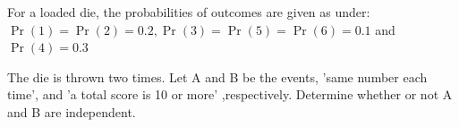 \documentclass[]{article}
\begin{document}
\providecommand{\qfunc}[1]{\ensuremath{Q\left(#1\right)}}
\providecommand{\gauss}[2]{\mathcal{N}\ensuremath{\left(#1,#2\right)}}
\providecommand{\diff}[2]{\ensuremath{\frac{d{#1}}{d{#2}}}}
\providecommand{\myceil}[1]{\left \lceil #1 \right \rceil }
\newcommand\figref{Fig.~\ref}
\newcommand\tabref{Table~\ref}
\newcommand{\sinc}{\,\text{sinc}\,}
\newcommand{\rect}{\,\text{rect}\,}

\let\vec\mathbf

For a loaded die, the probabilities of outcomes are given as under:
$\Pr(1) = \Pr(2) = 0.2, \Pr(3) = \Pr(5) = \Pr(6) = 0.1$ and $\Pr(4) = 0.3$

The die is thrown two times. Let A and B be the events, 'same number each time', and
'a total score is 10 or more' ,respectively. Determine whether or not A and B are independent.
\end{document}
